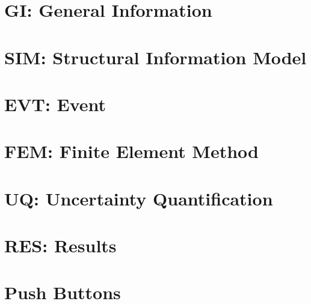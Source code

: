 

\section{GI: General Information}
\label{sec:generalInfo}


\section{SIM: Structural Information Model}
\label{sec:structuralInfo}


\section{EVT: Event}
\label{sec:event}


\section{FEM: Finite Element Method}
\label{sec:fem}


\section{UQ: Uncertainty Quantification}
\label{sec:uq}



\section{RES: Results}
\label{sec:results}



\section{Push Buttons}
\label{sec:push_buttons}

